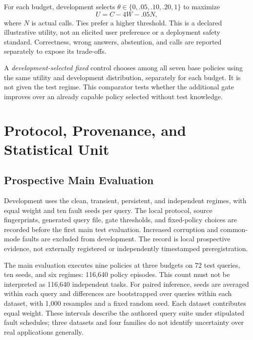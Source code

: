 \documentclass{svproc}
\begin{document}
For each budget, development selects $\theta\in\{0,.05,.10,.20,1\}$ to maximize
\begin{equation}
U=C-4W-.05N,
\label{eq:utility}
\end{equation}
where $N$ is actual calls. Ties prefer a higher threshold. This is a declared illustrative utility, not an elicited user preference or a deployment safety standard. Correctness, wrong answers, abstention, and calls are reported separately to expose its trade-offs.

A \emph{development-selected fixed} control chooses among all seven base policies using the same utility and development distribution, separately for each budget. It is not given the test regime. This comparator tests whether the additional gate improves over an already capable policy selected without test knowledge.

\section{Protocol, Provenance, and Statistical Unit}
\subsection{Prospective Main Evaluation}
Development uses the clean, transient, persistent, and independent regimes, with equal weight and ten fault seeds per query. The local protocol, source fingerprints, generated query file, gate thresholds, and fixed-policy choices are recorded before the first main test evaluation. Increased corruption and common-mode faults are excluded from development. The record is local prospective evidence, not externally registered or independently timestamped preregistration.

The main evaluation executes nine policies at three budgets on 72 test queries, ten seeds, and six regimes: 116,640 policy episodes. This count must not be interpreted as 116,640 independent tasks. For paired inference, seeds are averaged within each query and differences are bootstrapped over queries within each dataset, with 1,000 resamples and a fixed random seed. Each dataset contributes equal weight. These intervals describe the authored query suite under stipulated fault schedules; three datasets and four families do not identify uncertainty over real applications generally.
\end{document}
